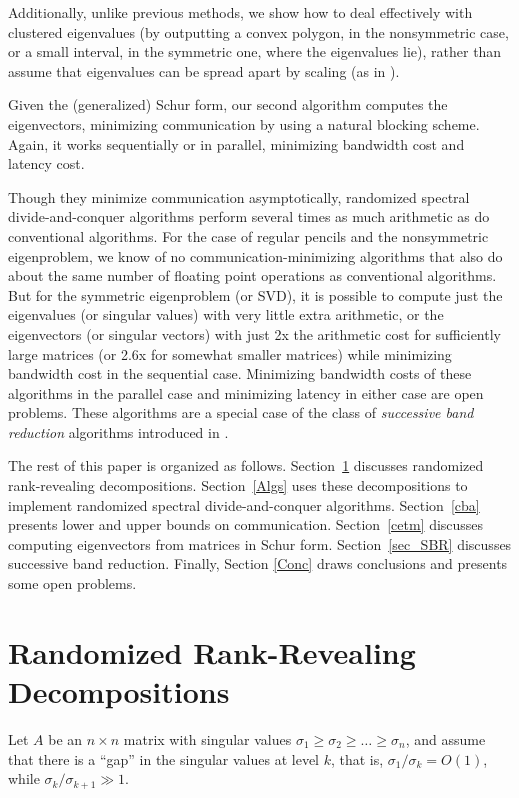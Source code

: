 \documentclass{article}
\theoremstyle{definition}
\begin{document}
Additionally, unlike previous methods, we show how to deal effectively with 
clustered eigenvalues (by outputting a convex polygon, in the nonsymmetric case, 
or a small interval, in the symmetric one, where the eigenvalues lie), rather than 
assume that eigenvalues can be spread apart by scaling (as in \cite{luyau}). 

Given the (generalized) Schur form, our second algorithm computes the eigenvectors, minimizing communication by using a natural blocking scheme. Again, it works sequentially or in parallel, minimizing bandwidth cost and latency cost.  

Though they minimize communication asymptotically, 
randomized spectral divide-and-conquer algorithms
perform several times as much arithmetic
as do conventional algorithms.  For the case of regular pencils and 
the nonsymmetric eigenproblem, we know of no communication-minimizing 
algorithms that also do about the same number of floating point operations as conventional algorithms.
But for the symmetric eigenproblem (or SVD), it is possible to 
compute just the eigenvalues (or singular values) with very little extra arithmetic,
or the eigenvectors (or singular vectors) 
with just 2x the arithmetic cost for sufficiently large matrices
(or 2.6x for somewhat smaller matrices)
while minimizing bandwidth cost in the sequential case.
Minimizing bandwidth costs of these algorithms in the parallel case 
and minimizing latency in either case are open problems.  
These algorithms are a special case of the class of
{\em successive band reduction} algorithms introduced in \cite{SBR1,SBR2}.

The rest of this paper is organized as follows.
Section~\ref{rrdr} discusses randomized rank-revealing decompositions.
Section~\ref{Algs} uses these decompositions to implement randomized spectral divide-and-conquer algorithms.
Section~\ref{cba} presents lower and upper bounds on communication.
Section~\ref{cetm} discusses computing eigenvectors from matrices in Schur form.
Section~\ref{sec_SBR} discusses successive band reduction.
Finally, Section \ref{Conc} draws conclusions and presents some open problems.

\section{Randomized Rank-Revealing Decompositions} \label{rrdr}

Let $A$ be an $n \times n$ matrix with singular values $\sigma_1 \geq \sigma_2 \geq \ldots \geq \sigma_n$, and assume that there is a ``gap'' in the singular values at level $k$, that is, $\sigma_1/\sigma_k = O(1)$, while $\sigma_k/\sigma_{k+1} \gg 1$. 
\end{document}

